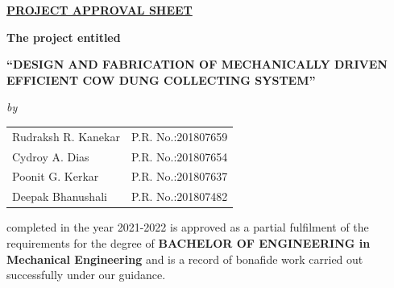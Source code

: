 \begin{center}
%
\underline{\bfseries \huge PROJECT APPROVAL SHEET}\\
\vspace{0.4cm}
\begin{figure}[H]
{\centering {}\par}
\end{figure}
\vspace{-0.6cm}
{\bfseries The project entitled}\\
\vspace{0.2cm}
\begin{large}
{\bfseries ``DESIGN AND FABRICATION OF MECHANICALLY DRIVEN\\EFFICIENT COW DUNG COLLECTING SYSTEM''}\\
\end{large}
\vspace{0.1cm}
\begin{small}
\emph{by}\\
\end{small}
\vspace{0.1cm}
\begin{table}[H]
\normalsize
\bfseries
\begin{center}
\begin{tabular}{ll}
Rudraksh R. Kanekar \hspace{1cm} & P.R. No.:201807659\\
Cydroy A. Dias & P.R. No.:201807654\\
Poonit G. Kerkar & P.R. No.:201807637\\
Deepak Bhanushali & P.R. No.:201807482\\
\end{tabular}
\end{center}
\end{table}
\vspace{-1.6cm}
\end{center}
\noindent completed in the year 2021-2022 is approved as a partial fulfilment of the requirements for the degree of {\bfseries BACHELOR OF ENGINEERING in Mechanical Engineering} and is a record of bonafide work carried out successfully under our guidance.\\




